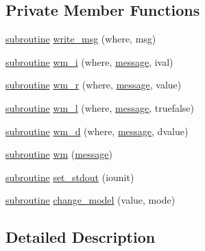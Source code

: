 \subsection*{Private Member Functions}
\begin{DoxyCompactItemize}
\item 
\hyperlink{M__stopwatch_83_8txt_acfbcff50169d691ff02d4a123ed70482}{subroutine} \hyperlink{interfacem__journal_1_1journal_aa275808b96de510b44676e53faba3566}{write\+\_\+msg} (where, msg)
\item 
\hyperlink{M__stopwatch_83_8txt_acfbcff50169d691ff02d4a123ed70482}{subroutine} \hyperlink{interfacem__journal_1_1journal_a1d3160c8b7e0f8273fde1ac71b6b4dc7}{wm\+\_\+i} (where, \hyperlink{M__stopwatch_83_8txt_aa4313e9a55405841f95e6550cd87fc3b}{message}, ival)
\item 
\hyperlink{M__stopwatch_83_8txt_acfbcff50169d691ff02d4a123ed70482}{subroutine} \hyperlink{interfacem__journal_1_1journal_a09564db3ada040acc04f1fd79a9eb731}{wm\+\_\+r} (where, \hyperlink{M__stopwatch_83_8txt_aa4313e9a55405841f95e6550cd87fc3b}{message}, value)
\item 
\hyperlink{M__stopwatch_83_8txt_acfbcff50169d691ff02d4a123ed70482}{subroutine} \hyperlink{interfacem__journal_1_1journal_a88c7dc90a1611f8ff74dcc76a7596d0f}{wm\+\_\+l} (where, \hyperlink{M__stopwatch_83_8txt_aa4313e9a55405841f95e6550cd87fc3b}{message}, truefalse)
\item 
\hyperlink{M__stopwatch_83_8txt_acfbcff50169d691ff02d4a123ed70482}{subroutine} \hyperlink{interfacem__journal_1_1journal_a9a977858d9fde59867ceae2beecd6957}{wm\+\_\+d} (where, \hyperlink{M__stopwatch_83_8txt_aa4313e9a55405841f95e6550cd87fc3b}{message}, dvalue)
\item 
\hyperlink{M__stopwatch_83_8txt_acfbcff50169d691ff02d4a123ed70482}{subroutine} \hyperlink{interfacem__journal_1_1journal_ae9fcc7d13b5f423e200acaf60ab50975}{wm} (\hyperlink{M__stopwatch_83_8txt_aa4313e9a55405841f95e6550cd87fc3b}{message})
\item 
\hyperlink{M__stopwatch_83_8txt_acfbcff50169d691ff02d4a123ed70482}{subroutine} \hyperlink{interfacem__journal_1_1journal_ab65b84f73ebce1cbac5bbcb047693b87}{set\+\_\+stdout} (iounit)
\item 
\hyperlink{M__stopwatch_83_8txt_acfbcff50169d691ff02d4a123ed70482}{subroutine} \hyperlink{interfacem__journal_1_1journal_a653c8f2c31a3cc3bd8b95e3d2e4c290f}{change\+\_\+model} (value, mode)
\end{DoxyCompactItemize}


\subsection{Detailed Description}

